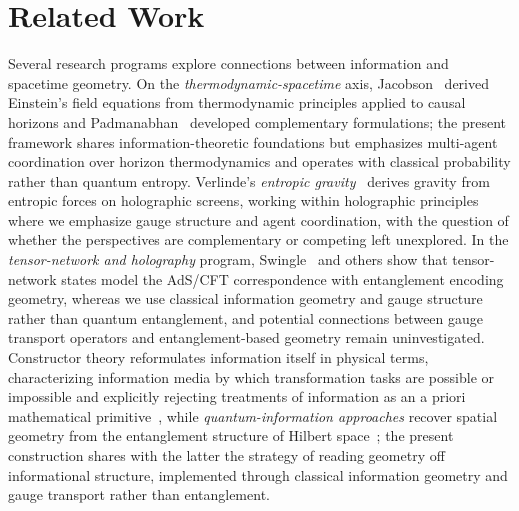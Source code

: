 \documentclass[11pt]{article}
\begin{document}
\section{Related Work}\label{sec:related_work}

Several research programs explore connections between information and spacetime geometry. On the \emph{thermodynamic-spacetime} axis, Jacobson~\cite{Jacobson1995} derived Einstein's field equations from thermodynamic principles applied to causal horizons and Padmanabhan~\cite{Padmanabhan2010} developed complementary formulations; the present framework shares information-theoretic foundations but emphasizes multi-agent coordination over horizon thermodynamics and operates with classical probability rather than quantum entropy. Verlinde's \emph{entropic gravity}~\cite{Verlinde2011} derives gravity from entropic forces on holographic screens, working within holographic principles where we emphasize gauge structure and agent coordination, with the question of whether the perspectives are complementary or competing left unexplored. In the \emph{tensor-network and holography} program, Swingle~\cite{Swingle2012} and others show that tensor-network states model the AdS/CFT correspondence with entanglement encoding geometry, whereas we use classical information geometry and gauge structure rather than quantum entanglement, and potential connections between gauge transport operators and entanglement-based geometry remain uninvestigated. Constructor theory reformulates information itself in physical terms, characterizing information media by which transformation tasks are possible or impossible and explicitly rejecting treatments of information as an a priori mathematical primitive~\cite{Deutsch2015}, while \emph{quantum-information approaches} recover spatial geometry from the entanglement structure of Hilbert space~\cite{Cao2017}; the present construction shares with the latter the strategy of reading geometry off informational structure, implemented through classical information geometry and gauge transport rather than entanglement.
\end{document}
